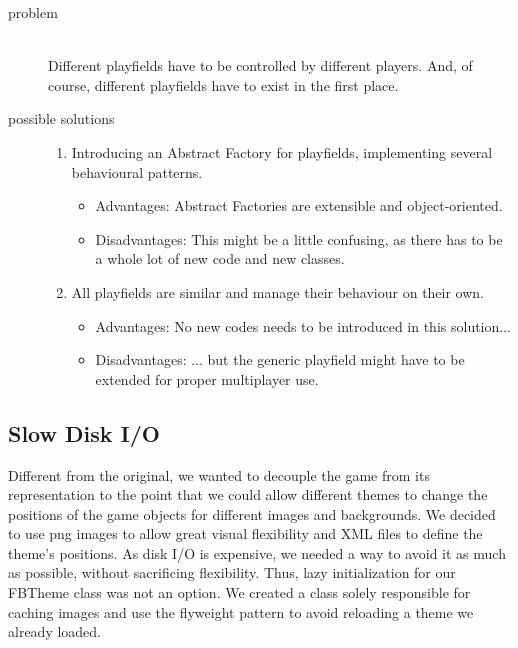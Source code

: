 \begin{description}
  \item[problem] ~\\ \hfill
    Different playfields have to be controlled by different players. And, of course, different playfields have to exist in the first place.
  \item[possible solutions] \hfill

    \begin{enumerate}
      \item Introducing an Abstract Factory for playfields, implementing several behavioural patterns.
      \begin{itemize}
        \item Advantages: Abstract Factories are extensible and object-oriented.
        \item Disadvantages: This might be a little confusing, as there has to be a whole lot of new code and new classes.
      \end{itemize}

      \item All playfields are similar and manage their behaviour on their own.
      \begin{itemize}
        \item Advantages: No new codes needs to be introduced in this solution...
        \item Disadvantages: ... but the generic playfield might have to be extended for proper multiplayer use.
      \end{itemize}
    \end{enumerate}
%
\end{description}
%
\subsection{Slow Disk I/O}
%
Different from the original, we wanted to decouple the game from its representation 
to the point that we could allow different themes to change the positions of the 
game objects for different images and backgrounds. We decided to use png images to allow 
great visual flexibility and XML files to define the theme's positions. As disk I/O
is expensive, we needed a way to avoid it as much as possible, without sacrificing 
flexibility. Thus, lazy initialization for our FBTheme class was not an option. 
We created a class solely responsible for caching images and use the flyweight 
pattern to avoid reloading a theme we already loaded.
%
